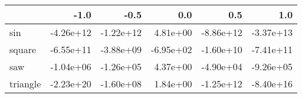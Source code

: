 \begin{tabular}{lrrrrr}
\toprule
{} &      -1.0 &      -0.5 &       0.0 &       0.5 &       1.0 \\
\midrule
sin      & -4.26e+12 & -1.22e+12 &  4.81e+00 & -8.86e+12 & -3.37e+13 \\
square   & -6.55e+11 & -3.88e+09 & -6.95e+02 & -1.60e+10 & -7.41e+11 \\
saw      & -1.04e+06 & -1.26e+05 &  4.37e+00 & -4.90e+04 & -9.26e+05 \\
triangle & -2.23e+20 & -1.60e+08 &  1.84e+00 & -1.25e+12 & -8.40e+16 \\
\bottomrule
\end{tabular}
